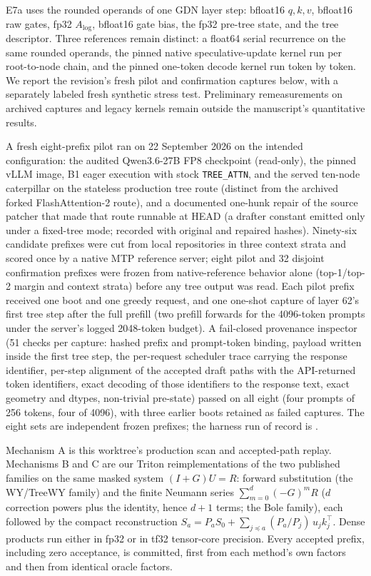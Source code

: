 \documentclass[conference]{IEEEtran}
\begin{document}
E7a uses the rounded operands of one GDN layer step: bfloat16 $q,k,v$, bfloat16 raw gates, fp32 $A_{\log}$, bfloat16 gate bias, the fp32 pre-tree state, and the tree descriptor. Three references remain distinct: a float64 serial recurrence on the same rounded operands, the pinned native speculative-update kernel run per root-to-node chain, and the pinned one-token decode kernel run token by token. We report the revision's fresh pilot and confirmation captures below, with a separately labeled fresh synthetic stress test. Preliminary remeasurements on archived captures and legacy kernels remain outside the manuscript's quantitative results.

A fresh eight-prefix pilot ran on 22 September 2026 on the intended configuration: the audited Qwen3.6-27B FP8 checkpoint (read-only), the pinned vLLM image, B1 eager execution with stock \texttt{TREE\_ATTN}, and the served ten-node caterpillar on the stateless production tree route (distinct from the archived forked FlashAttention-2 route), and a documented one-hunk repair of the source patcher that made that route runnable at HEAD (a drafter constant emitted only under a fixed-tree mode; recorded with original and repaired hashes). Ninety-six candidate prefixes were cut from local repositories in three context strata and scored once by a native MTP reference server; eight pilot and 32 disjoint confirmation prefixes were frozen from native-reference behavior alone (top-1/top-2 margin and context strata) before any tree output was read. Each pilot prefix received one boot and one greedy request, and one one-shot capture of layer 62's first tree step after the full prefill (two prefill forwards for the 4096-token prompts under the server's logged 2048-token budget). A fail-closed provenance inspector (51 checks per capture: hashed prefix and prompt-token binding, payload written inside the first tree step, the per-request scheduler trace carrying the response identifier, per-step alignment of the accepted draft paths with the API-returned token identifiers, exact decoding of those identifiers to the response text, exact geometry and dtypes, non-trivial pre-state) passed on all eight (four prompts of 256 tokens, four of 4096), with three earlier boots retained as failed captures. The eight sets are independent frozen prefixes; the harness run of record is .

Mechanism A is this worktree's production scan and accepted-path replay. Mechanisms B and C are our Triton reimplementations of the two published families on the same masked system $(I+G)U=R$: forward substitution (the WY/TreeWY family) and the finite Neumann series $\sum_{m=0}^{d}(-G)^mR$ ($d$ correction powers plus the identity, hence $d+1$ terms; the Bole family), each followed by the compact reconstruction $S_a=P_aS_0+\sum_{j\preceq a}(P_a/P_j)\,u_jk_j^\top$. Dense products run either in fp32 or in tf32 tensor-core precision. Every accepted prefix, including zero acceptance, is committed, first from each method's own factors and then from identical oracle factors.
\end{document}
